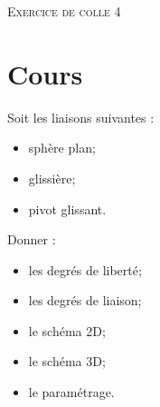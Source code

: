 \documentclass[11pt,oneside]{article}
\begin{document}
\pagestyle{fancy}
\renewcommand{\headrulewidth}{0pt}

\fancyhead{}

\fancyhead[C]{\rule{12cm}{.5pt}}


\renewcommand{\footrulewidth}{0.2pt}

\fancyfoot[C]{\footnotesize{\bfseries \thepage}}


\begin{center}
 \Large\textsc{Exercice de colle 4}
\end{center}

\section{Cours}

\begin{minipage}[c]{.55\linewidth}
Soit les liaisons suivantes :
\begin{itemize}
\item sphère plan;
\item glissière;
\item pivot glissant.
\end{itemize}
\end{minipage}\hfill
\begin{minipage}[c]{.55\linewidth}
Donner :
\begin{itemize}
\item les degrés de liberté;
\item les degrés de liaison; 
\item le schéma 2D;
\item le schéma 3D;
\item le paramétrage.
\end{itemize}
\end{minipage}
\end{document}
